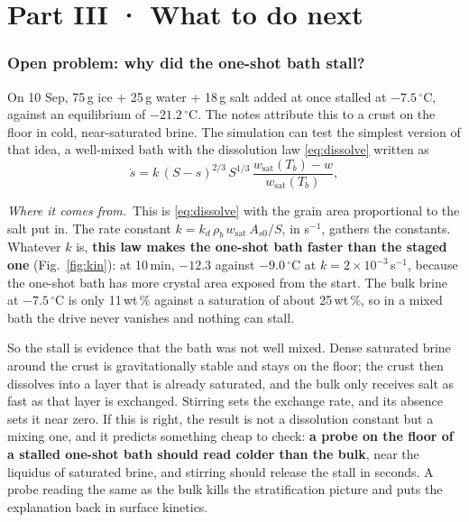 \documentclass[11pt,a4paper]{article}
\newcommand{\dC}{\,^{\circ}\mathrm{C}}
\newcommand{\where}{\par\noindent\textit{Where it comes from.}\ }
\begin{document}
\part*{Part III · What to do next}

\section{Open problem: why did the one-shot bath stall?}
\label{sec:stall}

On 10 Sep, 75\,g ice + 25\,g water + 18\,g salt added at once stalled at $-7.5\dC$, against an
equilibrium of $-21.2\dC$. The notes attribute this to a crust on the floor in cold,
near-saturated brine. The simulation can test the simplest version of that idea, a well-mixed
bath with the dissolution law \eqref{eq:dissolve} written as
\begin{equation}
\dot s = k\,(S-s)^{2/3}\,S^{1/3}\,\frac{w_{\text{sat}}(T_b) - w}{w_{\text{sat}}(T_b)},
\label{eq:kin}
\end{equation}
\where This is \eqref{eq:dissolve} with the grain area proportional to the salt put in. The rate
constant $k = k_d\,\rho_b\,w_{\text{sat}}\,A_{s0}/S$, in s$^{-1}$, gathers the constants. Whatever $k$ is,
\textbf{this law makes the one-shot bath faster than the staged one} (Fig.~\ref{fig:kin}): at 10\,min,
$-12.3$ against $-9.0\dC$ at $k = 2\times10^{-3}$\,s$^{-1}$, because the one-shot bath has more crystal
area exposed from the start. The bulk brine at $-7.5\dC$ is only 11\,wt\,\% against a saturation of
about 25\,wt\,\%, so in a mixed bath the drive never vanishes and nothing can stall.

So the stall is evidence that the bath was not well mixed. Dense saturated brine around the
crust is gravitationally stable and stays on the floor; the crust then dissolves into a layer
that is already saturated, and the bulk only receives salt as fast as that layer is exchanged.
Stirring sets the exchange rate, and its absence sets it near zero. If this is right, the
result is not a dissolution constant but a mixing one, and it predicts something cheap to check:
\textbf{a probe on the floor of a stalled one-shot bath should read colder than the bulk}, near
the liquidus of saturated brine, and stirring should release the stall in seconds. A probe
reading the same as the bulk kills the stratification picture and puts the explanation back in
surface kinetics.
\end{document}
